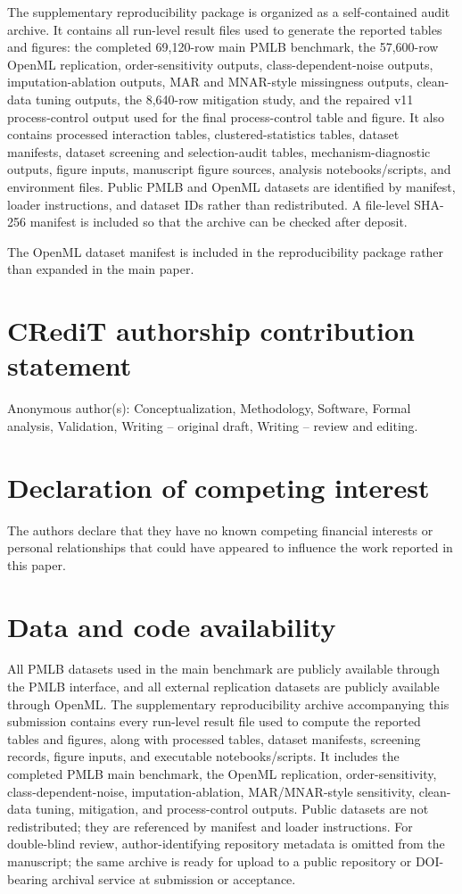\documentclass[preprint,12pt,number]{elsarticle}
\begin{document}
The supplementary reproducibility package is organized as a self-contained audit archive. It contains all run-level result files used to generate the reported tables and figures: the completed 69,120-row main PMLB benchmark, the 57,600-row OpenML replication, order-sensitivity outputs, class-dependent-noise outputs, imputation-ablation outputs, MAR and MNAR-style missingness outputs, clean-data tuning outputs, the 8,640-row mitigation study, and the repaired v11 process-control output used for the final process-control table and figure. It also contains processed interaction tables, clustered-statistics tables, dataset manifests, dataset screening and selection-audit tables, mechanism-diagnostic outputs, figure inputs, manuscript figure sources, analysis notebooks/scripts, and environment files. Public PMLB and OpenML datasets are identified by manifest, loader instructions, and dataset IDs rather than redistributed. A file-level SHA-256 manifest is included so that the archive can be checked after deposit.

The OpenML dataset manifest is included in the reproducibility package rather than expanded in the main paper.

\section*{CRediT authorship contribution statement}
Anonymous author(s): Conceptualization, Methodology, Software, Formal analysis, Validation, Writing -- original draft, Writing -- review and editing.

\section*{Declaration of competing interest}
The authors declare that they have no known competing financial interests or personal relationships that could have appeared to influence the work reported in this paper.

\section*{Data and code availability}
All PMLB datasets used in the main benchmark are publicly available through the PMLB interface, and all external replication datasets are publicly available through OpenML. The supplementary reproducibility archive accompanying this submission contains every run-level result file used to compute the reported tables and figures, along with processed tables, dataset manifests, screening records, figure inputs, and executable notebooks/scripts. It includes the completed PMLB main benchmark, the OpenML replication, order-sensitivity, class-dependent-noise, imputation-ablation, MAR/MNAR-style sensitivity, clean-data tuning, mitigation, and process-control outputs. Public datasets are not redistributed; they are referenced by manifest and loader instructions. For double-blind review, author-identifying repository metadata is omitted from the manuscript; the same archive is ready for upload to a public repository or DOI-bearing archival service at submission or acceptance.
\end{document}
